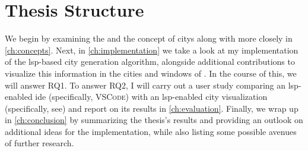 \documentclass[../thesis]{subfiles}
\begin{document}
\section{Thesis Structure}

We begin by examining the  and the concept of \glspl{city} along with \SEE{} more closely in \cref{ch:concepts}.
Next, in \cref{ch:implementation} we take a look at my implementation of the \gls{lsp}-based \gls{city} generation algorithm, alongside additional contributions to visualize this information in the cities and \glspl{window} of \SEE{}.
In the course of this, we will answer \textsf{RQ1}.
To answer \textsf{RQ2}, I will carry out a user study comparing an \gls{lsp}-enabled \gls{ide} (specifically, \textsc{VSCode}) with an \gls{lsp}-enabled \gls{city} visualization (specifically, \gls{see}) and report on its results in \cref{ch:evaluation}.
Finally, we wrap up in \cref{ch:conclusion} by summarizing the thesis's results and providing an outlook on additional ideas for the implementation, while also listing some possible avenues of further research.
\end{document}

